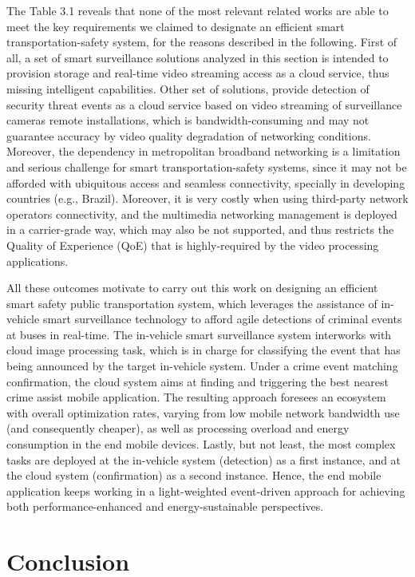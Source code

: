 The Table 3.1 reveals that none of the most relevant related works are able to meet the key requirements we claimed to designate an efficient smart transportation-safety system, for the reasons described in the following. First of all,  a set of smart surveillance solutions analyzed in this section is intended to provision storage and real-time video streaming access as a cloud service, thus missing intelligent capabilities. Other set of solutions, provide detection of security threat events as a cloud service based on video streaming of surveillance cameras remote installations, which is bandwidth-consuming and may not guarantee accuracy by video quality degradation of networking conditions. Moreover, the dependency in metropolitan broadband networking is a limitation and serious challenge for smart transportation-safety systems, since it may not be afforded with ubiquitous access and seamless connectivity, specially in developing countries (e.g., Brazil). Moreover, it is very costly when using third-party network operators connectivity, and the multimedia networking management is deployed in a carrier-grade way, which may also be not supported, and thus restricts the Quality of Experience (QoE) that is highly-required by the video processing applications.

All these outcomes motivate to carry out this work on designing an efficient smart safety public transportation system, which leverages the assistance of in-vehicle smart surveillance technology to afford agile detections of criminal events at buses in real-time. The in-vehicle smart surveillance system interworks with cloud image processing task, which is in charge for classifying the event that has being announced by the target in-vehicle system. Under a crime event matching confirmation, the cloud system aims at finding and triggering the best nearest crime assist mobile application. The resulting approach foresees an ecosystem with overall optimization rates, varying from low mobile network bandwidth use (and consequently cheaper), as well as processing overload and energy consumption in the end mobile devices. Lastly, but not least, the most complex tasks are deployed at the in-vehicle system (detection) as a first instance, and at the cloud system (confirmation) as a second instance. Hence, the end mobile application keeps working in a light-weighted event-driven approach for achieving both performance-enhanced and energy-sustainable perspectives.

\section{Conclusion}

